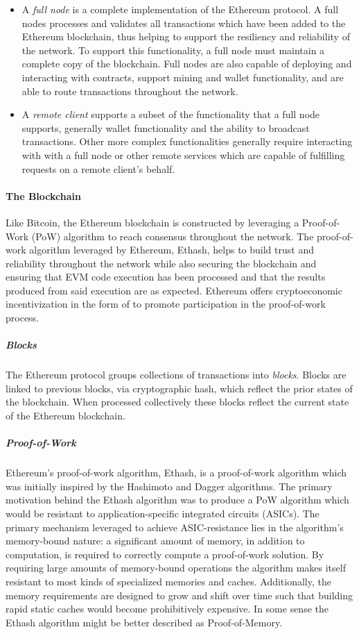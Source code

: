 \begin{itemize}
  \item A \emph{full node} is a complete implementation of the Ethereum
    protocol. A full nodes processes and validates all transactions which have
    been added to the Ethereum blockchain, thus helping to support the
    resiliency and reliability of the network. To support this functionality, a
    full node must maintain a complete copy of the blockchain. Full nodes are
    also capable of deploying and interacting with contracts, support mining and
    wallet functionality, and are able to route transactions throughout the
    network.

  \item A \emph{remote client} supports a subset of the functionality that a
    full node supports, generally wallet functionality and the ability to
    broadcast transactions. Other more complex functionalities generally require
    interacting with with a full node or other remote services which are capable
    of fulfilling requests on a remote client's behalf.
\end{itemize}

\paragraph{The Blockchain}
Like Bitcoin, the Ethereum blockchain is constructed by leveraging a
Proof-of-Work (PoW) algorithm to reach consensus throughout the network. The
proof-of-work algorithm leveraged by Ethereum, Ethash, helps to build trust and
reliability throughout the network while also securing the blockchain and
ensuring that EVM code execution has been processed and that the results
produced from said execution are as expected. Ethereum offers cryptoeconomic
incentivization in the form of  to promote participation in the
proof-of-work process.\cite{ethereum-yellow}

\subparagraph{Blocks}
The Ethereum protocol groups collections of transactions into \emph{blocks}.
Blocks are linked to previous blocks, via cryptographic hash, which reflect the
prior states of the blockchain. When processed collectively these blocks reflect
the current state of the Ethereum blockchain.

\subparagraph{Proof-of-Work}
Ethereum's proof-of-work algorithm, Ethash, is a proof-of-work algorithm which
was initially inspired by the Hashimoto and Dagger algorithms. The primary
motivation behind the Ethash algorithm was to produce a PoW algorithm which
would be resistant to application-specific integrated circuits (ASICs). The
primary mechanism leveraged to achieve ASIC-resistance lies in the algorithm's
memory-bound nature: a significant amount of memory, in addition to computation,
is required to correctly compute a proof-of-work solution. By requiring large
amounts of memory-bound operations the algorithm makes itself resistant to most
kinds of specialized memories and caches. Additionally, the memory requirements
are designed to grow and shift over time such that building rapid static caches
would become prohibitively expensive. In some sense the Ethash algorithm might
be better described as Proof-of-Memory.\cite{dagger-hashimoto,hashimoto,dagger}

